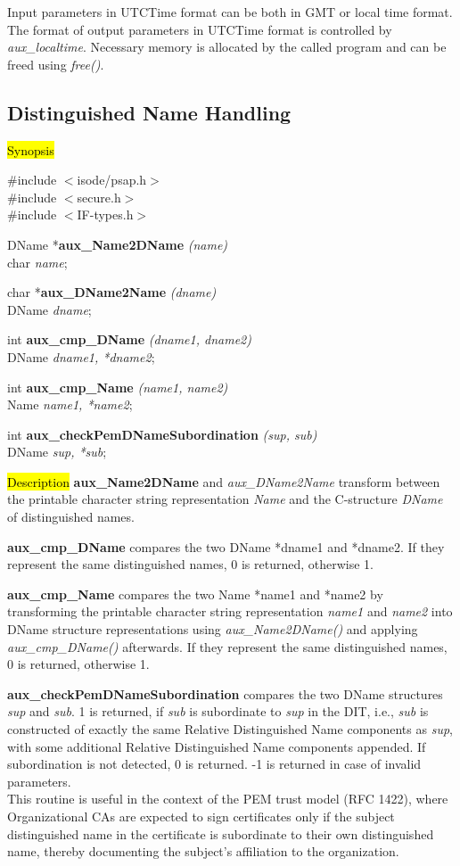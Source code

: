 Input parameters in UTCTime format can be both in GMT or local time format. The
format of output parameters in UTCTime format is controlled by {\em aux\_localtime}.
Necessary memory is allocated by the called program and can be freed using
{\em free()}.

\subsection{Distinguished Name Handling}
\label{aux_name}
\hl{Synopsis}

\#include $<$isode/psap.h$>$ \\
\#include $<$secure.h$>$ \\
\#include $<$IF-types.h$>$ 

DName *{\bf aux\_Name2DName} {\em (name)} \\
char {\em *name};

char *{\bf aux\_DName2Name} {\em (dname)} \\
DName {\em *dname};

int {\bf aux\_cmp\_DName} {\em  (dname1, dname2)} \\
DName {\em *dname1, *dname2};

int {\bf aux\_cmp\_Name} {\em  (name1, name2)} \\
Name {\em *name1, *name2};

int {\bf aux\_checkPemDNameSubordination} {\em  (sup, sub)} \\
DName {\em *sup, *sub};

\hl{Description}
{\bf aux\_Name2DName} and {\em aux\_DName2Name} transform between
the printable character string representation {\em Name} and the
C-structure {\em DName} of distinguished names. 

{\bf aux\_cmp\_DName} compares the two DName *dname1 and *dname2.
If they represent the same distinguished names,
0 is returned, otherwise 1. 

{\bf aux\_cmp\_Name} compares the two Name *name1 and *name2 by
transforming the printable character string representation {\em name1} 
and {\em name2} into DName structure representations using
{\em aux\_Name2DName()} and applying {\em aux\_cmp\_DName()}
afterwards.
If they represent the same distinguished names,
0 is returned, otherwise 1.

{\bf aux\_checkPemDNameSubordination} compares the two DName structures {\em *sup} and {\em *sub}.
1 is returned, 
if {\em sub} is subordinate to {\em sup} in the DIT, i.e., {\em sub} is constructed of exactly the same
Relative Distinguished Name components as {\em sup}, with some additional Relative Distinguished Name
components appended.
If subordination is not detected, 0 is returned. -1 is returned in case of invalid parameters.\\
This routine is useful in the context of the PEM trust model (RFC 1422), where 
Organizational CAs are expected to sign certificates only if the subject distinguished
name in the certificate is subordinate to their own distinguished name, thereby 
documenting the subject's affiliation to the organization.

